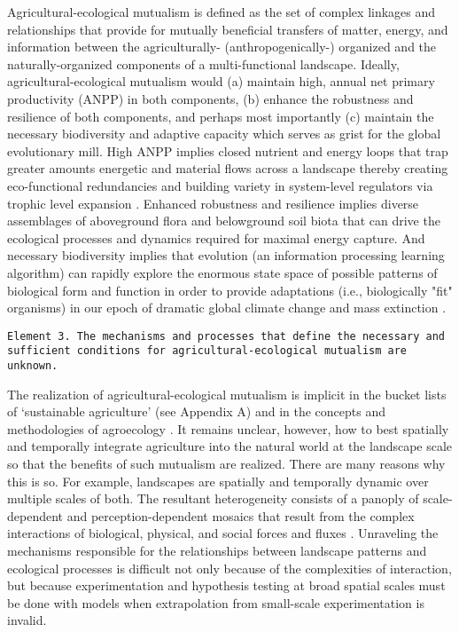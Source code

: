 \documentclass[twoside]{article}	%
\begin{document}
Agricultural-ecological mutualism is defined as the set of complex linkages and relationships that provide for mutually beneficial transfers of matter, energy, and information between the agriculturally- (anthropogenically-) organized and the naturally-organized components of a multi-functional landscape. Ideally, agricultural-ecological mutualism would (a) maintain high, annual net primary productivity (ANPP) in both components, (b) enhance the robustness and resilience of both components, and perhaps most importantly (c) maintain the necessary biodiversity and adaptive capacity which serves as grist for the global evolutionary mill.  High ANPP implies closed nutrient and energy loops that trap greater amounts energetic and material flows across a landscape thereby creating eco-functional redundancies and building variety in system-level regulators via trophic level expansion \citep{ashby_introduction_1955}. Enhanced robustness and resilience implies diverse assemblages of aboveground flora and belowground soil biota that can drive the ecological processes and dynamics required for maximal energy capture. And necessary biodiversity implies that evolution (an information processing learning algorithm) can rapidly explore the enormous state space of possible patterns of biological form and function in order to provide adaptations (i.e., biologically "fit" organisms) in our epoch of dramatic global climate change and mass extinction \citep{ceballos_accelerated_2015}.\\

\begin{sloppypar}
\texttt{Element 3. The mechanisms and processes that define the necessary and sufficient conditions for agricultural-ecological mutualism are unknown.}\\
\end{sloppypar}

The realization of agricultural-ecological mutualism is implicit in the bucket lists of \enquote*{sustainable agriculture} (see Appendix A) and in the concepts and methodologies of agroecology \citep{gliessman_agroecology:_2015}. It remains unclear, however, how to best spatially and temporally integrate agriculture into the natural world at the landscape scale so that the benefits of such mutualism are realized. There are many reasons why this is so. For example, landscapes are spatially and temporally dynamic over multiple scales of both. The resultant heterogeneity consists of a panoply of scale-dependent and perception-dependent mosaics that result from the complex interactions of biological, physical, and social forces and fluxes \citep{turner_landscape_1989}. Unraveling the mechanisms responsible for the relationships between landscape patterns and ecological processes is difficult not only because of the complexities of interaction, but because experimentation and hypothesis testing at broad spatial scales must be done with models when extrapolation from small-scale experimentation is invalid. \\
\end{document}
